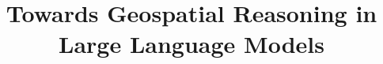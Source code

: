 \documentclass[sigconf]{acmart}
\theoremstyle{plain}
\theoremstyle{definition}
\theoremstyle{remark}
\begin{document}












\title{Towards Geospatial Reasoning in Large Language Models}
\end{document}
